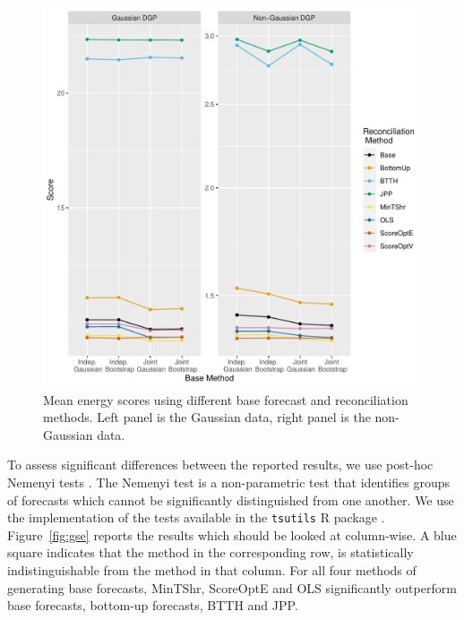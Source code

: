 \documentclass[a4paper,12pt]{article}
\theoremstyle{definition}
\begin{document}
\begin{figure}[!htb]
  \centering
  \includegraphics[height=0.45\textheight]{Figs/energy_meanscore}
  \caption{Mean energy scores using different base forecast and reconciliation methods. Left panel is the Gaussian data, right panel is the non-Gaussian data.}
  \label{fig:meanscore_e}
\end{figure}

To assess significant differences between the reported results, we use post-hoc Nemenyi tests \citep{HolEtAl2013}. The Nemenyi test is a non-parametric test that identifies groups of forecasts which cannot be significantly distinguished from one another. We use the implementation of the tests available in the \verb|tsutils| R package \citep{tsutilspackage}. Figure~\ref{fig:gse} reports the results which should be looked at column-wise. A blue square indicates that the method in the corresponding row, is statistically indistinguishable from the method in that column. For all four methods of generating base forecasts, MinTShr, ScoreOptE and OLS significantly outperform base forecasts, bottom-up forecasts, BTTH and JPP.
\end{document}
